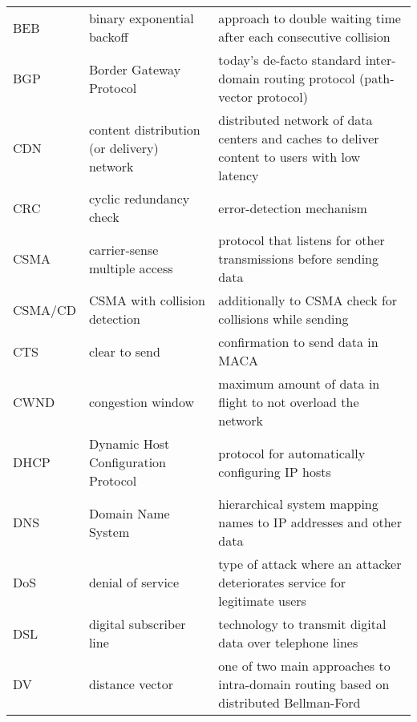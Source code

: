 \begin{longtable}{p{1.7cm} | p{5cm} | p{8cm}}
    BEB     & binary exponential backoff                  & approach to double waiting time after each consecutive collision                                    \\
    BGP     & Border Gateway Protocol                     & today's de-facto standard inter-domain routing protocol (path-vector protocol)                      \\
    CDN     & content distribution (or delivery) network  & distributed network of data centers and caches to deliver content to users with low latency         \\
    CRC     & cyclic redundancy check                     & error-detection mechanism                                                                           \\
    CSMA    & carrier-sense multiple access               & protocol that listens for other transmissions before sending data                                   \\
    CSMA/CD & CSMA with collision detection               & additionally to CSMA check for collisions while sending                                             \\
    CTS     & clear to send                               & confirmation to send data in MACA                                                                   \\
    CWND    & congestion window                           & maximum amount of data in flight to not overload the network                                        \\
    DHCP    & Dynamic Host Configuration Protocol         & protocol for automatically configuring IP hosts                                                     \\
    DNS     & Domain Name System                          & hierarchical system mapping names to IP addresses and other data                                    \\
    DoS     & denial of service                           & type of attack where an attacker deteriorates service for legitimate users                          \\
    DSL     & digital subscriber line                     & technology to transmit digital data over telephone lines                                            \\
    DV      & distance vector                             & one of two main approaches to intra-domain routing based on distributed Bellman-Ford                \\

\end{longtable}
